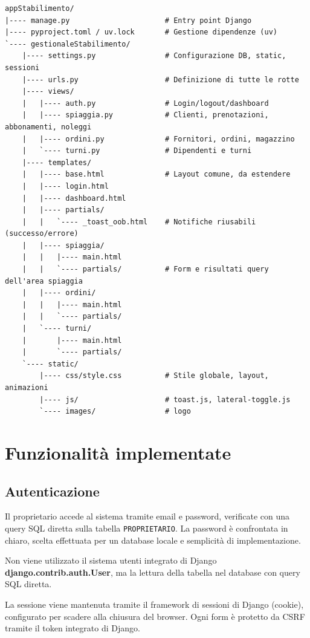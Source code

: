 \begin{verbatim}
appStabilimento/
|---- manage.py                      # Entry point Django
|---- pyproject.toml / uv.lock       # Gestione dipendenze (uv)
`---- gestionaleStabilimento/
    |---- settings.py                # Configurazione DB, static, sessioni
    |---- urls.py                    # Definizione di tutte le rotte
    |---- views/
    |   |---- auth.py                # Login/logout/dashboard
    |   |---- spiaggia.py            # Clienti, prenotazioni, abbonamenti, noleggi
    |   |---- ordini.py              # Fornitori, ordini, magazzino
    |   `---- turni.py               # Dipendenti e turni
    |---- templates/
    |   |---- base.html              # Layout comune, da estendere
    |   |---- login.html
    |   |---- dashboard.html
    |   |---- partials/
    |   |   `---- _toast_oob.html    # Notifiche riusabili (successo/errore)
    |   |---- spiaggia/
    |   |   |---- main.html
    |   |   `---- partials/          # Form e risultati query dell'area spiaggia
    |   |---- ordini/
    |   |   |---- main.html
    |   |   `---- partials/
    |   `---- turni/
    |       |---- main.html
    |       `---- partials/
    `---- static/
        |---- css/style.css          # Stile globale, layout, animazioni
        |---- js/                    # toast.js, lateral-toggle.js
        `---- images/                # logo
\end{verbatim}

\clearpage

\section{Funzionalit\`{a} implementate}

\subsection{Autenticazione}
Il proprietario accede al sistema tramite email e password, verificate con una
query SQL diretta sulla tabella \texttt{PROPRIETARIO}. La password \`{e}
confrontata in chiaro, scelta effettuata per un database locale e semplicità di implementazione.

Non viene utilizzato il sistema utenti integrato di Django \textbf{django.contrib.auth.User}, ma 
la lettura della tabella  nel database con query SQL diretta.

La sessione viene mantenuta tramite il framework di sessioni di
Django (cookie), configurato per scadere alla chiusura del browser. Ogni form
\`{e} protetto da CSRF tramite il token integrato di Django.

